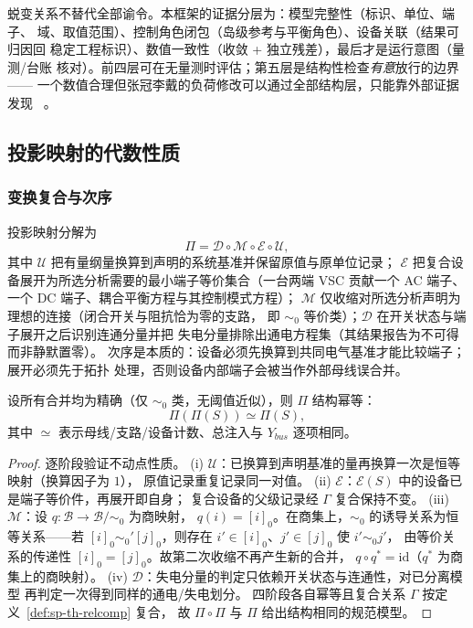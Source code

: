 \begin{remark}[谕令分层]
蜕变关系不替代全部谕令。本框架的证据分层为：模型完整性（标识、单位、端子、
域、取值范围）、控制角色闭包（岛级参考与平衡角色）、设备关联（结果可归因回
稳定工程标识）、数值一致性（收敛 + 独立残差），最后才是运行意图（量测/台账
核对）。前四层可在无量测时评估；第五层是结构性检查\emph{有意}放行的边界——
一个数值合理但张冠李戴的负荷修改可以通过全部结构层，只能靠外部证据发现
~\cite{spth:segura16}。
\end{remark}

\subsection{投影映射的代数性质}\label{sec:sp-th-projection}

\subsubsection{变换复合与次序}
\begin{definition}[投影的物理变换复合]\label{def:sp-th-proj-compose}
投影映射分解为
\begin{equation}
\Pi=\mathcal D\circ\mathcal M\circ\mathcal E\circ\mathcal U,
\label{eq:sp-th-proj-compose}
\end{equation}
其中 $\mathcal U$ 把有量纲量换算到声明的系统基准并保留原值与原单位记录；
$\mathcal E$ 把复合设备展开为所选分析需要的最小端子等价集合（一台两端 VSC
贡献一个 AC 端子、一个 DC 端子、耦合平衡方程与其控制模式方程）；
$\mathcal M$ 仅收缩对所选分析声明为理想的连接（闭合开关与阻抗恰为零的支路，
即 $\sim_0$ 等价类）；$\mathcal D$ 在开关状态与端子展开之后识别连通分量并把
失电分量排除出通电方程集（其结果报告为不可得而非静默置零）。
次序是本质的：设备必须先换算到共同电气基准才能比较端子；展开必须先于拓扑
处理，否则设备内部端子会被当作外部母线误合并。
\end{definition}

\begin{proposition}[精确级联下的幂等性]\label{prop:sp-th-idempotent}
设所有合并均为精确（仅 $\sim_0$ 类，无阈值近似），则 $\Pi$ 结构幂等：
\begin{equation}
\Pi(\Pi(S))\simeq\Pi(S),
\end{equation}
其中 $\simeq$ 表示母线/支路/设备计数、总注入与 $Y_{bus}$ 逐项相同。
\end{proposition}
\begin{proof}
逐阶段验证不动点性质。
(i) $\mathcal U$：已换算到声明基准的量再换算一次是恒等映射（换算因子为 $1$），
原值记录重复记录同一对值。
(ii) $\mathcal E$：$\mathcal E(S)$ 中的设备已是端子等价件，再展开即自身；
复合设备的父级记录经 $\Gamma$ 复合保持不变。
(iii) $\mathcal M$：设 $q:\mathcal B\to\mathcal B/{\sim_0}$ 为商映射，
$q(i)=[i]_0$。在商集上，$\sim_0$ 的诱导关系为恒等关系——若
$[i]_0\sim_0'[j]_0$，则存在 $i'\in[i]_0$、$j'\in[j]_0$ 使 $i'\sim_0 j'$，
由等价关系的传递性 $[i]_0=[j]_0$。故第二次收缩不再产生新的合并，
$q\circ q^{*}=\mathrm{id}$（$q^{*}$ 为商集上的商映射）。
(iv) $\mathcal D$：失电分量的判定只依赖开关状态与连通性，对已分离模型
再判定一次得到同样的通电/失电划分。
四阶段各自幂等且复合关系 $\Gamma$ 按定义~\ref{def:sp-th-relcomp} 复合，
故 $\Pi\circ\Pi$ 与 $\Pi$ 给出结构相同的规范模型。
\end{proof}

